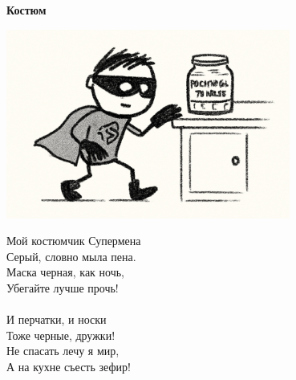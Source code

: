 \vspace*{\fill}
\begin{center}
  {\huge\textbf{Костюм}}

  \vspace{1.5em}  \includegraphics[width=0.7\textwidth]{pictures/superman_costume.png}
  \vspace{4em}
  \parbox{0.6\textwidth}{
    \LARGE
    \begin{spacing}{1.2}
      Мой костюмчик Супермена\\
      Серый, словно мыла пена.\\
      Маска черная, как ночь,\\
      Убегайте лучше прочь!\\
      \\
      И перчатки, и носки\\
      Тоже черные, дружки!\\
      Не спасать лечу я мир,\\
      А на кухне съесть зефир! %
    \end{spacing}
      
  }
\end{center}
\vspace*{\fill}